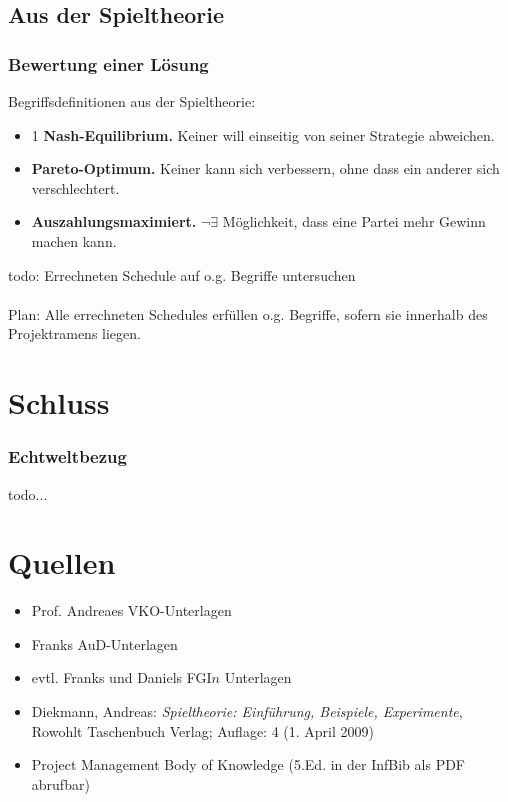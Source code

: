 \documentclass[%
	handout,
	compressed
]{beamer}
\begin{document}
	\subsection{Aus der Spieltheorie}
		\begin{frame}
			\frametitle{Bewertung einer Lösung}
			Begriffsdefinitionen aus der Spieltheorie:
			\begin{itemize}
				\item1 \textbf{Nash-Equilibrium.}		Keiner will einseitig von seiner Strategie abweichen.\pause
				\item \textbf{Pareto-Optimum.}			Keiner kann sich verbessern, ohne dass ein anderer sich verschlechtert.\pause
				\item \textbf{Auszahlungsmaximiert.}	$\lnot \exists$ Möglichkeit, dass eine Partei mehr Gewinn machen kann.
			\end{itemize}
		\end{frame}
		\begin{frame}
			todo: Errechneten Schedule auf o.g. Begriffe untersuchen\\
			\-\\
			Plan: Alle errechneten Schedules erfüllen o.g. Begriffe, sofern sie innerhalb des Projektramens liegen.
		\end{frame}
\section{Schluss}
		\begin{frame}
			\frametitle{Echtweltbezug}
			todo...
		\end{frame}
\section{Quellen}
		\begin{frame}
			\begin{itemize}
				\item Prof. Andreaes VKO-Unterlagen
				\item Franks AuD-Unterlagen
				\item evtl. Franks und Daniels FGI$n$ Unterlagen
				\item Diekmann, Andreas: \textit{Spieltheorie: Einführung, Beispiele, Experimente}, Rowohlt Taschenbuch Verlag; Auflage: 4 (1. April 2009)
				\item Project Management Body of Knowledge (5.Ed. in der InfBib als PDF abrufbar)
			\end{itemize}
		\end{frame}
\end{document}
